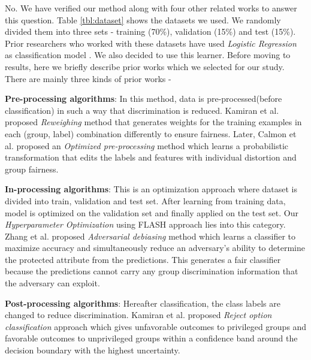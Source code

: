 No. We have verified our method along with four other related works to answer this question. Table \ref{tbl:dataset} shows the datasets we used. We randomly divided them into three sets - training (70\%), validation (15\%) and test (15\%). Prior researchers who worked with these datasets have used \textit{Logistic Regression} as classification model \cite{Kamishima,NIPS2017_6988,Hardt}. We also decided to use this learner. Before moving to results, here we briefly describe prior works which we selected for our study. There are mainly three kinds of prior works -

\bi
\item \textbf{Pre-processing algorithms}: In this method, data is pre-processed(before classification) in such a way that discrimination is reduced. Kamiran et al. proposed \textit{Reweighing} \cite{Kamiran2012} method that generates weights for the training examples in each (group, label) combination differently to ensure fairness. Later, Calmon et al. proposed an \textit{Optimized pre-processing} method \cite{NIPS2017_6988} which learns a probabilistic transformation that edits the labels and features with individual distortion and group fairness.


\item \textbf{In-processing algorithms}: This is an optimization approach where dataset is divided into train, validation and test set. After learning from training data, model is optimized on the validation set and finally applied on the test set. Our \textit{Hyperparameter Optimization} using FLASH approach lies into this category. Zhang et al. proposed \textit{Adversarial debiasing}  \cite{Zhang:2018:MUB:3278721.3278779} method which learns a classifier to maximize accuracy and simultaneously reduce an adversary's ability to determine the protected attribute from the predictions. This generates a fair classifier because the predictions cannot carry any group discrimination information that the adversary can exploit.


\item \textbf{Post-processing algorithms}: Hereafter classification, the class labels are changed to reduce discrimination. Kamiran et al. proposed \textit{Reject option classification} approach \cite{Kamiran:2018:ERO:3165328.3165686} which gives unfavorable outcomes to privileged groups and favorable outcomes to unprivileged groups within a confidence band around the decision boundary with the highest uncertainty.

\ei

